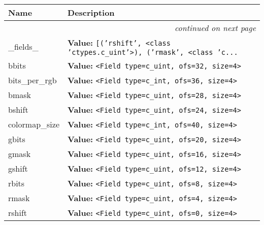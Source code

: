    \vspace{-1cm}
\hspace{\varindent}\begin{longtable}{|p{\varnamewidth}|p{\vardescrwidth}|l}
\cline{1-2}
\cline{1-2} \centering \textbf{Name} & \centering \textbf{Description}& \\
\cline{1-2}
\endhead\cline{1-2}\multicolumn{3}{r}{\small\textit{continued on next page}}\\\endfoot\cline{1-2}
\endlastfoot\raggedright \_\-f\-i\-e\-l\-d\-s\-\_\- & \raggedright \textbf{Value:} 
{\tt \texttt{[}\texttt{(}\texttt{'}\texttt{rshift}\texttt{'}\texttt{, }{\textless}class 'ctypes.c\_uint'{\textgreater}\texttt{)}\texttt{, }\texttt{(}\texttt{'}\texttt{rmask}\texttt{'}\texttt{, }{\textless}class 'c\texttt{...}}&\\
\cline{1-2}
\raggedright b\-b\-i\-t\-s\- & \raggedright \textbf{Value:} 
{\tt {\textless}Field type=c\_uint, ofs=32, size=4{\textgreater}}&\\
\cline{1-2}
\raggedright b\-i\-t\-s\-\_\-p\-e\-r\-\_\-r\-g\-b\- & \raggedright \textbf{Value:} 
{\tt {\textless}Field type=c\_int, ofs=36, size=4{\textgreater}}&\\
\cline{1-2}
\raggedright b\-m\-a\-s\-k\- & \raggedright \textbf{Value:} 
{\tt {\textless}Field type=c\_uint, ofs=28, size=4{\textgreater}}&\\
\cline{1-2}
\raggedright b\-s\-h\-i\-f\-t\- & \raggedright \textbf{Value:} 
{\tt {\textless}Field type=c\_uint, ofs=24, size=4{\textgreater}}&\\
\cline{1-2}
\raggedright c\-o\-l\-o\-r\-m\-a\-p\-\_\-s\-i\-z\-e\- & \raggedright \textbf{Value:} 
{\tt {\textless}Field type=c\_int, ofs=40, size=4{\textgreater}}&\\
\cline{1-2}
\raggedright g\-b\-i\-t\-s\- & \raggedright \textbf{Value:} 
{\tt {\textless}Field type=c\_uint, ofs=20, size=4{\textgreater}}&\\
\cline{1-2}
\raggedright g\-m\-a\-s\-k\- & \raggedright \textbf{Value:} 
{\tt {\textless}Field type=c\_uint, ofs=16, size=4{\textgreater}}&\\
\cline{1-2}
\raggedright g\-s\-h\-i\-f\-t\- & \raggedright \textbf{Value:} 
{\tt {\textless}Field type=c\_uint, ofs=12, size=4{\textgreater}}&\\
\cline{1-2}
\raggedright r\-b\-i\-t\-s\- & \raggedright \textbf{Value:} 
{\tt {\textless}Field type=c\_uint, ofs=8, size=4{\textgreater}}&\\
\cline{1-2}
\raggedright r\-m\-a\-s\-k\- & \raggedright \textbf{Value:} 
{\tt {\textless}Field type=c\_uint, ofs=4, size=4{\textgreater}}&\\
\cline{1-2}
\raggedright r\-s\-h\-i\-f\-t\- & \raggedright \textbf{Value:} 
{\tt {\textless}Field type=c\_uint, ofs=0, size=4{\textgreater}}&\\
\cline{1-2}
\end{longtable}

